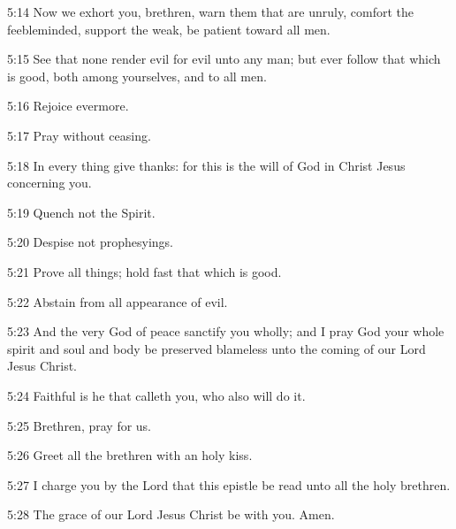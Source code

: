 5:14 Now we exhort you, brethren, warn them that are unruly, comfort
the feebleminded, support the weak, be patient toward all men.

5:15 See that none render evil for evil unto any man; but ever follow
that which is good, both among yourselves, and to all men.

5:16 Rejoice evermore.

5:17 Pray without ceasing.

5:18 In every thing give thanks: for this is the will of God in Christ
Jesus concerning you.

5:19 Quench not the Spirit.

5:20 Despise not prophesyings.

5:21 Prove all things; hold fast that which is good.

5:22 Abstain from all appearance of evil.

5:23 And the very God of peace sanctify you wholly; and I pray God
your whole spirit and soul and body be preserved blameless unto the
coming of our Lord Jesus Christ.

5:24 Faithful is he that calleth you, who also will do it.

5:25 Brethren, pray for us.

5:26 Greet all the brethren with an holy kiss.

5:27 I charge you by the Lord that this epistle be read unto all the
holy brethren.

5:28 The grace of our Lord Jesus Christ be with you. Amen.

